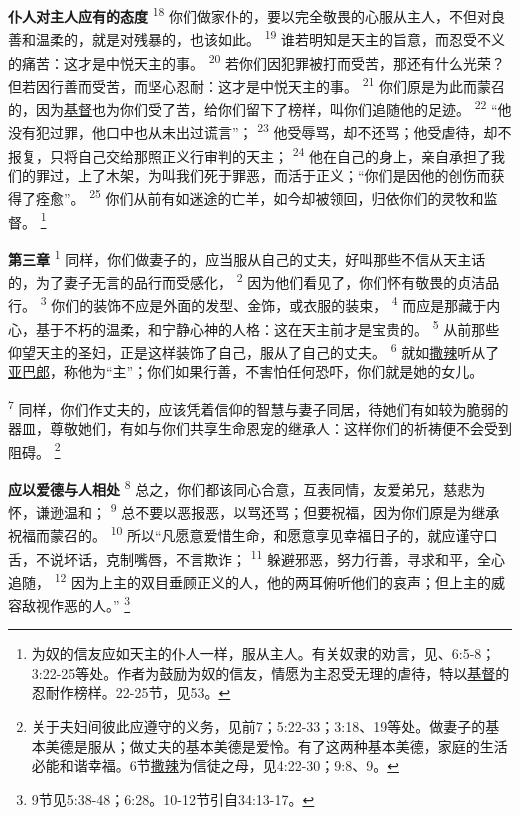 \textbf{仆人对主人应有的态度\quad}
\textsuperscript{18}
你们做家仆的，要以完全敬畏的心服从主人，不但对良善和温柔的，就是对残暴的，也该如此。
\textsuperscript{19}
谁若明知是天主的旨意，而忍受不义的痛苦：这才是中悦天主的事。
\textsuperscript{20}
若你们因犯罪被打而受苦，那还有什么光荣？但若因行善而受苦，而坚心忍耐：这才是中悦天主的事。
\textsuperscript{21}
你们原是为此而蒙召的，因为\uline{基督}也为你们受了苦，给你们留下了榜样，叫你们追随他的足迹。
\textsuperscript{22}
“他没有犯过罪，他口中也从未出过谎言”；
\textsuperscript{23}
他受辱骂，却不还骂；他受虐待，却不报复，只将自己交给那照正义行审判的天主；
\textsuperscript{24}
他在自己的身上，亲自承担了我们的罪过，上了木架，为叫我们死于罪恶，而活于正义；“你们是因他的创伤而获得了痊愈”。
\textsuperscript{25}
你们从前有如迷途的亡羊，如今却被领回，归依你们的灵牧和监督。
\footnote{为奴的信友应如天主的仆人一样，服从主人。有关奴隶的劝言，见、6:5-8；3:22-25等处。作者为鼓励为奴的信友，情愿为主忍受无理的虐待，特以\uline{基督}的忍耐作榜样。22-25节，见53。}

\textbf{第三章\quad}
\textsuperscript{1}
同样，你们做妻子的，应当服从自己的丈夫，好叫那些不信从天主话的，为了妻子无言的品行而受感化，
\textsuperscript{2}
因为他们看见了，你们怀有敬畏的贞洁品行。
\textsuperscript{3}
你们的装饰不应是外面的发型、金饰，或衣服的装束，
\textsuperscript{4}
而应是那藏于内心，基于不朽的温柔，和宁静心神的人格：这在天主前才是宝贵的。
\textsuperscript{5}
从前那些仰望天主的圣妇，正是这样装饰了自己，服从了自己的丈夫。
\textsuperscript{6}
就如\uline{撒辣}听从了\uline{亚巴郎}，称他为“主”；你们如果行善，不害怕任何恐吓，你们就是她的女儿。

\textsuperscript{7}
同样，你们作丈夫的，应该凭着信仰的智慧与妻子同居，待她们有如较为脆弱的器皿，尊敬她们，有如与你们共享生命恩宠的继承人：这样你们的祈祷便不会受到阻碍。
\footnote{关于夫妇间彼此应遵守的义务，见前7；5:22-33；3:18、19等处。做妻子的基本美德是服从；做丈夫的基本美德是爱怜。有了这两种基本美德，家庭的生活必能和谐幸福。6节\uline{撒辣}为信徒之母，见4:22-30；9:8、9。}

\textbf{应以爱德与人相处\quad}
\textsuperscript{8}
总之，你们都该同心合意，互表同情，友爱弟兄，慈悲为怀，谦逊温和；
\textsuperscript{9}
总不要以恶报恶，以骂还骂；但要祝福，因为你们原是为继承祝福而蒙召的。
\textsuperscript{10}
所以“凡愿意爱惜生命，和愿意享见幸福日子的，就应谨守口舌，不说坏话，克制嘴唇，不言欺诈；
\textsuperscript{11}
躲避邪恶，努力行善，寻求和平，全心追随，
\textsuperscript{12}
因为上主的双目垂顾正义的人，他的两耳俯听他们的哀声；但上主的威容敌视作恶的人。”
\footnote{9节见5:38-48；6:28。10-12节引自34:13-17。}

